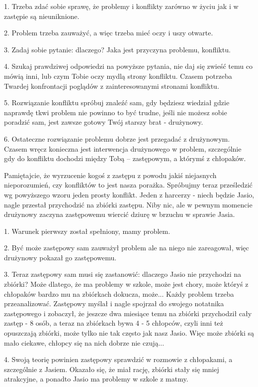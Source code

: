 1.
Trzeba zdać sobie sprawę, że problemy i konflikty zarówno w  życiu jak i w zastępie są nieuniknione.

2.
Problem trzeba zauważyć, a więc trzeba mieć oczy i uszy otwarte.

3.
Zadaj sobie pytanie: dlaczego? Jaka jest przyczyna problemu, konfliktu.

4.
Szukaj prawdziwej odpowiedzi na powyższe pytania, nie daj  się zwieść temu co mówią inni, lub czym Tobie oczy  mydlą  strony konfliktu. Czasem potrzeba Twardej konfrontacji poglądów z zainteresowanymi stronami konfliktu.

5.
Rozwiązanie konfliktu spróbuj znaleźć sam, gdy będziesz wiedział  gdzie naprawdę tkwi problem nie powinno to być trudne, jeśli nie możesz sobie poradzić sam, jest zawsze  gotowy Twój  starszy brat - drużynowy.

6.
Ostateczne rozwiązanie problemu dobrze jest przegadać z drużynowym. Czasem wręcz konieczna jest interwencja drużynowego  w  problem, szczególnie gdy do konfliktu dochodzi między Tobą – zastępowym, a którymś z  chłopaków.


Pamiętajcie, że wyrzucenie kogoś z zastępu z powodu jakiś niejasnych nieporozumień, czy konfliktów to jest nasza porażka. Spróbujmy teraz prześledzić wg  powyższego  wzoru jeden prosty konflikt. Jeden z harcerzy - niech będzie Jasio, nagle przestał przychodzić na zbiórki zastępu. Niby nic, ale w pewnym momencie drużynowy zaczyna zastępowemu wiercić dziurę w brzuchu w  sprawie Jasia.

1.
Warunek  pierwszy  został   spełniony,  mamy  problem.

2.
Być  może  zastępowy  sam zauważył problem ale na niego nie  zareagował, więc drużynowy pokazał go zastępowemu. 

3.
Teraz zastępowy sam musi się zastanowić:  dlaczego Jasio nie  przychodzi na zbiórki? Może dlatego,  że ma problemy w  szkole,  może  jest chory, może któryś z chłopaków bardzo mu na zbiórkach dokucza,  może... Każdy problem trzeba przeanalizować. Zastępowy myślał i nagle spojrzał do  swojego notatnika zastępowego i zobaczył, że jeszcze dwa miesiące  temu na  zbiórki przychodził cały zastęp - 8 osób,  a teraz  na  zbiórkach bywa 4 - 5 chłopców, czyli inni też  opuszczają  zbiórki,  może  tylko nie tak często jak nasz Jasio. Więc może zbiórki są mało  ciekawe,  chłopcy  się na nich dobrze nie czują...

4.
Swoją teorię powinien zastępowy sprawdzić  w rozmowie z chłopakami, a szczególnie z Jasiem. Okazało się, że miał  rację,  zbiórki  stały się mniej atrakcyjne, a ponadto Jasio ma problemy w szkole  z matmy.

